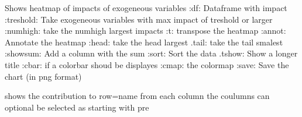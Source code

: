 \documentclass[letterpaper,10pt,english]{sphinxmanual}
\begin{document}
\begin{fulllineitems}
\label{\detokenize{vis/modelvis:modelvis.attshow}}
\pysigstartsignatures
{}
\pysigstopsignatures
\sphinxAtStartPar
Shows heatmap of impacts of exogeneous variables
:df: Dataframe with impact
:treshold: Take exogeneous variables with max impact of treshold or larger
:numhigh: take the numhigh largest impacts
:t: transpose the heatmap
:annot: Annotate the heatmap
:head: take the head largest
.tail: take the tail smalest
:showsum: Add a column with the sum
:sort: Sort the data
.tshow: Show a longer title
:cbar:  if a colorbar shoud be displayes
:cmap: the colormap
:save: Save the chart (in png format)

\end{fulllineitems}


\begin{fulllineitems}
\label{\detokenize{vis/modelvis:modelvis.attshowone}}
\pysigstartsignatures
{}
\pysigstopsignatures
\sphinxAtStartPar
shows the contribution to row=name from each column
the coulumns can optional be selected as starting with pre

\end{fulllineitems}
\end{document}
